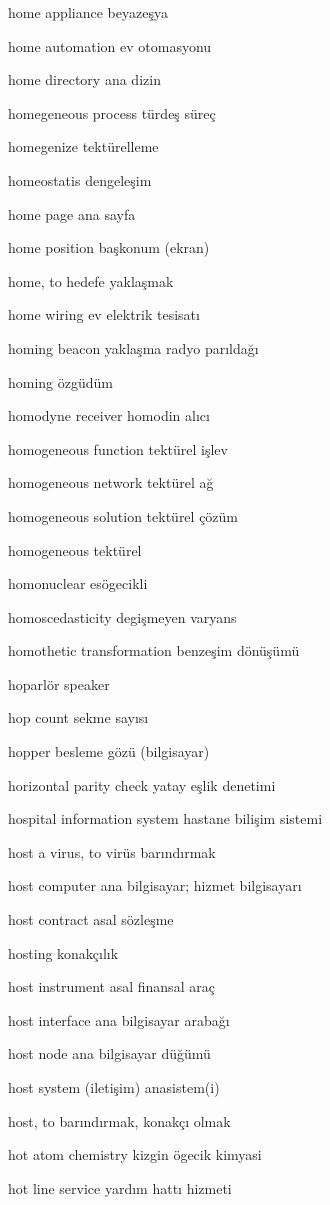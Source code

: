 \documentclass[12pt,fleqn]{article}\usepackage{../../common}
\begin{document}
home appliance beyazeşya

home automation ev otomasyonu

home directory ana dizin

homegeneous process türdeş süreç

homegenize tektürelleme

homeostatis dengeleşim

home page ana sayfa

home position başkonum (ekran)

home, to hedefe yaklaşmak

home wiring ev elektrik tesisatı

homing beacon yaklaşma radyo parıldağı

homing özgüdüm

homodyne receiver homodin alıcı

homogeneous function tektürel işlev

homogeneous network tektürel ağ

homogeneous solution tektürel çözüm

homogeneous tektürel

homonuclear esögecikli

homoscedasticity degişmeyen varyans

homothetic transformation benzeşim dönüşümü

hoparlör speaker

hop count sekme sayısı

hopper besleme gözü (bilgisayar)

horizontal parity check yatay eşlik denetimi

hospital information system hastane bilişim sistemi

host a virus, to virüs barındırmak

host computer ana bilgisayar; hizmet bilgisayarı

host contract asal sözleşme

hosting konakçılık

host instrument asal finansal araç

host interface ana bilgisayar arabağı

host node ana bilgisayar düğümü

host system (iletişim) anasistem(i)

host, to barındırmak, konakçı olmak

hot atom chemistry kizgin ögecik kimyasi

hot line service yardım hattı hizmeti
\end{document}
